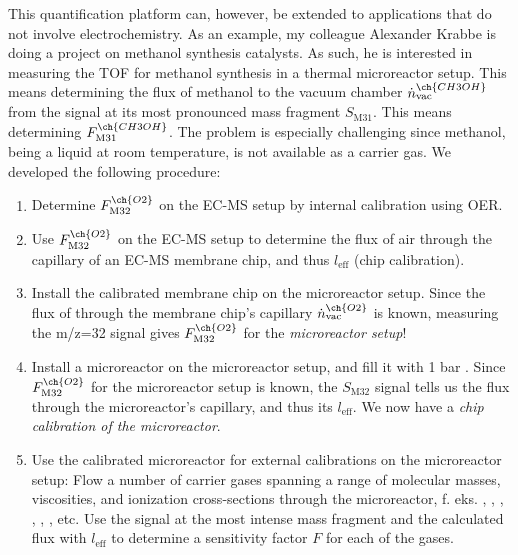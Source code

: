 This quantification platform can, however, be extended to applications that do not involve electrochemistry. As an example, my colleague Alexander Krabbe is doing a project on methanol synthesis catalysts. As such, he is interested in measuring the TOF for methanol synthesis in a thermal microreactor setup. This means determining the flux of methanol to the vacuum chamber $\dot{n}_\text{vac}^{\ch{CH3OH}}$ from the signal at its most pronounced mass fragment $S_\text{M31}$. This means determining $F_\text{M31}^{\ch{CH3OH}}$. The problem is especially challenging since methanol, being a liquid at room temperature, is not available as a carrier gas. We developed the following procedure:
\begin{enumerate}
	\item Determine $F_\text{M32}^{\ch{O2}}$ on the EC-MS setup by internal calibration using OER. \label{step:meth1}
	
	\item Use $F_\text{M32}^{\ch{O2}}$ on the EC-MS setup to determine the flux of air through the capillary of an EC-MS membrane chip, and thus $l_\text{eff}$ (chip calibration). 
	
	\item Install the calibrated membrane chip on the microreactor setup. Since the flux of  through the membrane chip's capillary $\dot{n}_\text{vac}^{\ch{O2}}$ is known, measuring the m/z=32 signal gives $F_\text{M32}^{\ch{O2}}$ for the \textit{microreactor setup}!
	
	\item Install a microreactor on the microreactor setup, and fill it with 1 bar . Since $F_\text{M32}^{\ch{O2}}$ for the microreactor setup is known, the $S_\text{M32}$ signal tells us the  flux through the microreactor's capillary, and thus its $l_\text{eff}$. We now have a \textit{chip calibration of the microreactor}. \label{step:meth4}
	
	\item Use the calibrated microreactor for external calibrations on the microreactor setup: Flow a number of carrier gases spanning a range of molecular masses, viscosities, and ionization cross-sections through the microreactor, f. eks. , , , , , , etc. Use the signal at the most intense mass fragment and the calculated flux with $l_\text{eff}$ to determine a sensitivity factor $F$ for each of the gases.
	

\end{enumerate}
